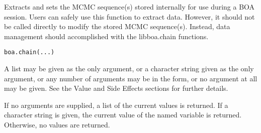\begin{Description}\relax
Extracts and sets the MCMC sequence(s) stored internally for use during a BOA
session. Users can safely use this function to extract data. However, it
should not be called directly to modify the stored MCMC sequence(s). Instead,
data management should accomplished with the libboa.chain functions.
\end{Description}
\begin{Usage}
\begin{verbatim}
boa.chain(...)
\end{verbatim}
\end{Usage}
\begin{Arguments}
\begin{ldescription}
\item[\code{...}] A list may be given as the only argument, or a character string
given as the only argument, or any number of arguments may be in the
 form, or no argument at all may be given. See the
Value and Side Effects sections for further details.
\end{ldescription}
\end{Arguments}
\begin{Value}
If no arguments are supplied, a list of the current values is returned. If a
character string is given, the current value of the named variable is returned.
Otherwise, no values are returned.
\end{Value}
